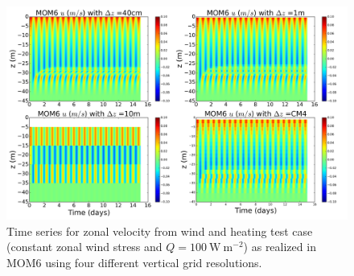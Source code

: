 \begin{figure}[h!t]
\begin{center}
\includegraphics[angle=0,width=14cm]{./figs/MOM6/skin_warming_wind_KPP_MOM6_zonal_velocity.png}
\caption[Zonal velocity from MOM6 for wind and heating test]{\sf Time
  series for zonal velocity from wind and heating test case (constant
  zonal wind stress and $Q=100~\mbox{W}~\mbox{m}^{-2}$) as realized in
  MOM6 using four different vertical grid resolutions.}
\label{fig:MOM6_zonal-wind_and_heating}
\end{center}
\end{figure}


